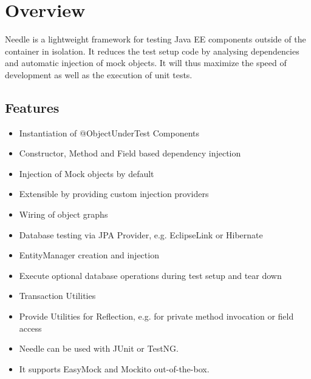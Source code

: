 \chapter{Overview}

Needle is a lightweight framework for testing Java EE components outside of the
container in isolation. It reduces the test setup code by analysing dependencies and
automatic injection of mock objects. It will thus maximize the speed of development as well as the execution of unit tests.

\section{Features}
\begin{itemize}
	\item Instantiation of @ObjectUnderTest Components
	\item Constructor, Method and Field based dependency injection
	\item Injection of Mock objects by default
	\item Extensible by providing custom injection providers
	\item Wiring of object graphs

	\item Database testing via JPA Provider, e.g. EclipseLink or Hibernate
	\item EntityManager creation and injection
	\item Execute optional database operations during test setup and tear down
	\item Transaction Utilities

	\item Provide Utilities for Reflection, e.g. for private method invocation or field access

	\item Needle can be used with JUnit or TestNG.
	\item It supports EasyMock and Mockito out-of-the-box.
\end{itemize}